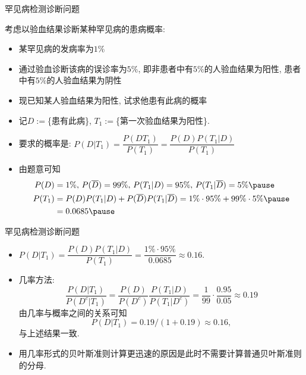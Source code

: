 \documentclass[Prob-All.tex]{subfiles}
\begin{document}
\begin{frame}{罕见病检测诊断问题}
	\begin{exam}考虑以验血结果诊断某种罕见病的患病概率:
		\begin{itemize}[<+-|alert@+>]
			\item 	某罕见病的发病率为$1\%$
			\item 通过验血诊断该病的误诊率为$5\%$, 即非患者中有$5\%$的人验血结果为阳性, 患者中有$5\%$的人验血结果为阴性
			\item 现已知某人验血结果为阳性, 试求他患有此病的概率
		\end{itemize}
	\end{exam}
	\pause

	\begin{jieda}
		\begin{itemize}[<+-|alert@+>]
			\item 记$D:=$\{患有此病\}, $T_{1}:=$\{第一次验血结果为阳性\}.
			\item 要求的概率是: $P(D|T_{1})=\dfrac{P(DT_{1})}{P(T_{1})}=\dfrac{P(D)P(T_{1}|D)}{P(T_{1})}$
			\item 由题意可知%
			\begin{align*}
				P(D)&=1\%,\,P(\overline{D})=99\%, \, P(T_{1}|D)=95\%,\,P(T_{1}|\overline{D})=5\%\pause \\
				P(T_{1})&=P(D)P(T_{1}|D)+P(\overline{D})P(T_{1}|\overline{D})=1\%\cdot 95\%+99\%\cdot 5\% \pause \\
        &=0.0685\pause
			\end{align*}
		\end{itemize}
	\end{jieda}
\end{frame}

			\begin{frame}{罕见病检测诊断问题}
				\begin{itemize}[<+-|alert@+>]

			\item
			$P(D|T_{1})=\dfrac{P(D)P(T_{1}|D)}{P(T_{1})}=\dfrac{1\%\cdot 95\%}{0.0685}\approx 0.16.$
		    \item 几率方法:
			$$\frac{P(D|T_1)}{P(D^c|T_1)}=\frac{P(D)}{P(D^c)}\frac{P(T_1|D)}{P(T_1|D^c)}=\frac{1}{99}\cdot\frac{0.95}{0.05}\approx 0.19$$
			\pause
			由几率与概率之间的关系可知
			$$P(D|T_1)=0.19/(1+0.19)\approx 0.16, $$ 与上述结果一致.
			\item 用几率形式的贝叶斯准则计算更迅速的原因是此时不需要计算普通贝叶斯准则的分母.
		\end{itemize}
\end{frame}
\end{document}
